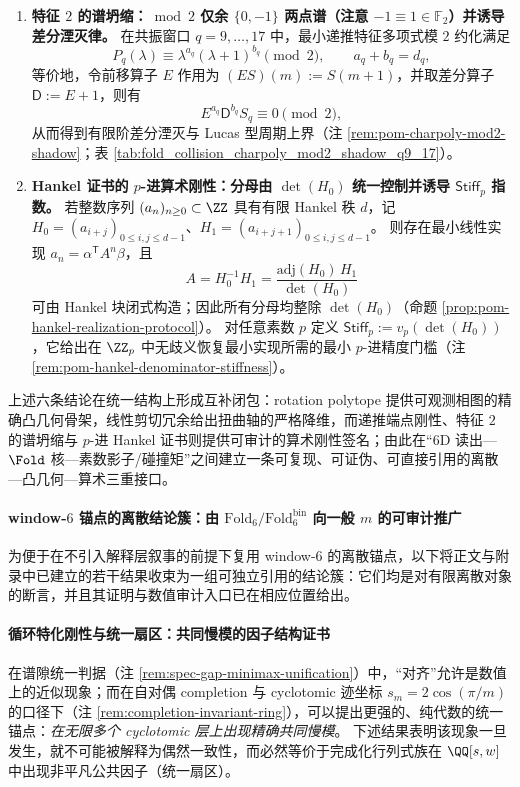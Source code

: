 \begin{theorem}
\begin{enumerate}
  \item \textbf{特征 \(2\) 的谱坍缩：\(\bmod 2\) 仅余 \(\{0,-1\}\) 两点谱（注意 \(-1\equiv 1\in\mathbb{F}_2\)）并诱导差分湮灭律。}
  在共振窗口 \(q=9,\dots,17\) 中，最小递推特征多项式模 \(2\) 约化满足
  \[
  P_q(\lambda)\equiv \lambda^{a_q}(\lambda+1)^{b_q}\pmod 2,\qquad a_q+b_q=d_q,
  \]
  等价地，令前移算子 \(E\) 作用为 \((ES)(m):=S(m+1)\)，并取差分算子 \(\mathsf{D}:=E+1\)，则有
  \[
  E^{a_q}\mathsf{D}^{b_q}S_q\equiv 0\pmod 2,
  \]
  从而得到有限阶差分湮灭与 Lucas 型周期上界（注 \ref{rem:pom-charpoly-mod2-shadow}；表 \ref{tab:fold_collision_charpoly_mod2_shadow_q9_17}）。

  \item \textbf{Hankel 证书的 \(p\)-进算术刚性：分母由 \(\det(H_0)\) 统一控制并诱导 \(\mathsf{Stiff}_p\) 指数。}
  若整数序列 \((a_n)_{n\ge 0}\subset\ZZ\) 具有有限 Hankel 秩 \(d\)，记
  \(H_0=(a_{i+j})_{0\le i,j\le d-1}\)、\(H_1=(a_{i+j+1})_{0\le i,j\le d-1}\)。
  则存在最小线性实现 \(a_n=\alpha^{\mathsf T}A^n\beta\)，且
  \[
  A=H_0^{-1}H_1=\frac{\mathrm{adj}(H_0)\,H_1}{\det(H_0)}
  \]
  可由 Hankel 块闭式构造；因此所有分母均整除 \(\det(H_0)\)（命题 \ref{prop:pom-hankel-realization-protocol}）。
  对任意素数 \(p\) 定义
  \(
  \mathsf{Stiff}_p:=v_p(\det(H_0))
  \)，它给出在 \(\ZZ_p\) 中无歧义恢复最小实现所需的最小 \(p\)-进精度门槛（注 \ref{rem:pom-hankel-denominator-stiffness}）。
\end{enumerate}
上述六条结论在统一结构上形成互补闭包：rotation polytope 提供可观测相图的精确凸几何骨架，线性剪切冗余给出扭曲轴的严格降维，而递推端点刚性、特征 \(2\) 的谱坍缩与 \(p\)-进 Hankel 证书则提供可审计的算术刚性签名；由此在“6D 读出—\(\Fold\) 核—素数影子/碰撞矩”之间建立一条可复现、可证伪、可直接引用的离散—凸几何—算术三重接口。
\end{theorem}

\paragraph{window-\(6\) 锚点的离散结论簇：由 \texorpdfstring{$\mathrm{Fold}_6/\mathrm{Fold}^{\mathrm{bin}}_6$}{Fold6/Foldbin6} 向一般 \texorpdfstring{$m$}{m} 的可审计推广}
为便于在不引入解释层叙事的前提下复用 window-\(6\) 的离散锚点，以下将正文与附录中已建立的若干结果收束为一组可独立引用的结论簇：它们均是对有限离散对象的断言，并且其证明与数值审计入口已在相应位置给出。


\paragraph{循环特化刚性与统一扇区：共同慢模的因子结构证书}
在谱隙统一判据（注 \ref{rem:spec-gap-minimax-unification}）中，“对齐”允许是数值上的近似现象；而在自对偶 completion 与 cyclotomic 迹坐标 \(s_m=2\cos(\pi/m)\) 的口径下（注 \ref{rem:completion-invariant-ring}），可以提出更强的、纯代数的统一锚点：\emph{在无限多个 cyclotomic 层上出现精确共同慢模}。
下述结果表明该现象一旦发生，就不可能被解释为偶然一致性，而必然等价于完成化行列式族在 \(\QQ[s,w]\) 中出现非平凡公共因子（统一扇区）。

